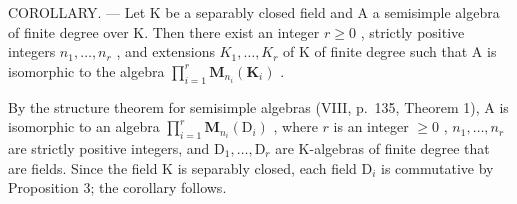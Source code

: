 COROLLARY. --- Let K be a separably closed field and A a semisimple algebra of finite degree over K. Then there exist an integer \(r \geqslant 0\) , strictly positive integers \(n_{1}, \ldots, n_{r}\) , and extensions \(K_{1}, \ldots, K_{r}\) of K of finite degree such that A is isomorphic to the algebra \(\prod_{i=1}^{r} \mathbf{M}_{n_{i}}(\mathbf{K}_{i})\) .

By the structure theorem for semisimple algebras (VIII, p.~135, Theorem 1), A is isomorphic to an algebra \(\prod_{i=1}^{r} \mathbf{M}_{n_i}(\mathrm{D}_i)\) , where \(r\) is an integer \(\geqslant 0\) , \(n_1, \ldots, n_r\) are strictly positive integers, and \(\mathrm{D}_1, \ldots, \mathrm{D}_r\) are K-algebras of finite degree that are fields. Since the field K is separably closed, each field \(\mathrm{D}_i\) is commutative by Proposition 3; the corollary follows.

